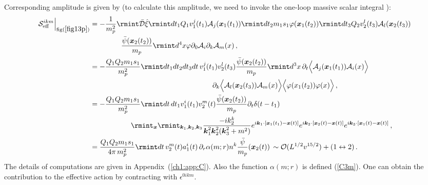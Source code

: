 \begin{itemize}
{Corresponding amplitude is given by (to calculate this amplitude, we need to invoke the one-loop massive scalar integral \cite{Anastasiou:1999ui,2022arXiv220103593W})}: %
\begin{align}
\begin{split}
    \mathcal{S}_{\text{eff}}^{ikm}\Big |_{{\text{fig}(\ref{fig13p})}}&=-\frac{1}{m_p^2}\rmint \Bar{\mathcal{D}}\hat{\xi}\rmint dt_1 Q_1v_1^{j}(t_1)\mathcal{A}_{j}(\boldsymbol{x}_1(t_1))\rmint dt_2 m_1s_1 \varphi(\boldsymbol{x}_1(t_2))\rmint dt_3 Q_2 v_2^{l}(t_3)\mathcal{A}_{l}(\boldsymbol{x}_2(t_3))\\&\,\,\,\,\,\,\,\,\,\,\,\,\,\,\,\,\,\,\,\,\,\,\,\,\,\,\frac{\Bar{\psi}(\boldsymbol{x}_2(t_2))}{m_p}\rmint d^4x \varphi\partial_0 \mathcal{A}_{i}\partial_{k} \mathcal{A}_{m}(x)\,,\\ &
        =-\frac{Q_1Q_2m_1s_1}{m_p^2}\rmint dt_1dt_2dt_3dt\,v_1^{j}(t_1)v_2^{l}(t_3)\frac{\Bar{\psi}(\boldsymbol{x}_2(t_2))}{m_p}\rmint d^3 x \,\partial_{t}\Big\langle\mathcal{A}_{j}(\boldsymbol{x}_1(t_1))\mathcal{A}_{i}(x)\Big\rangle\\ &
\hspace{6cm}\partial_{k}\Big\langle\mathcal{A}_{l}(\boldsymbol{x}_2(t_3))  \mathcal{A}_{m}(x)  \Big\rangle\Big\langle \varphi(x_1(t_2))\varphi(x)\Big\rangle\,,\\ &
    =-\frac{Q_1Q_2m_1s_1}{m_p^2}\rmint dt\, dt_1 v_1^{i}(t_1)v_2^{m}(t)\frac{\Bar{\psi}(\boldsymbol{x}_2(t_2))}{m_p}\partial_{t}\delta(t-t_1)\,\\&\hspace{2cm} \rmint_{\boldsymbol{x}} \rmint_{\boldsymbol{k}_1,\boldsymbol{k}_2,\boldsymbol{k}_3}\frac{-ik_2^{k}}{\boldsymbol{k}_1^2\boldsymbol{k}_2^2(\boldsymbol{k}_3^2+m^2)}e^{i\boldsymbol{k}_1\cdot[\boldsymbol{x}_1(t_1)-\boldsymbol{x}(t)]}e^{i\boldsymbol{k}_2\cdot[\boldsymbol{x}_2(t)-\boldsymbol{x}(t)]} 
       e^{i\boldsymbol{k}_3\cdot[\boldsymbol{x}_1(t)-\boldsymbol{x}(t)]}\,,\\ &
  =\frac{Q_1 Q_2 m_1 s_1}{4\pi\,m_p^2}\rmint dt \, v_2^m (t)a_1^i(t)\,\partial_r\alpha(m;r)n^k \frac{\bar{\psi}}{m_p}(\boldsymbol{x}_2(t))\,\sim \mathcal{O}(L^{1/2}v^{15/2})+(1\leftrightarrow 2)\,.\label{5.85n}
  \end{split}
\end{align}
The details of computations are given in Appendix~(\ref{ch1:app:C}). Also the function  $\alpha(m;r)$ is defined (\ref{C3m}). One can obtain the contribution to the effective action by contracting with $\epsilon^{0ikm}$.
\end{itemize}
